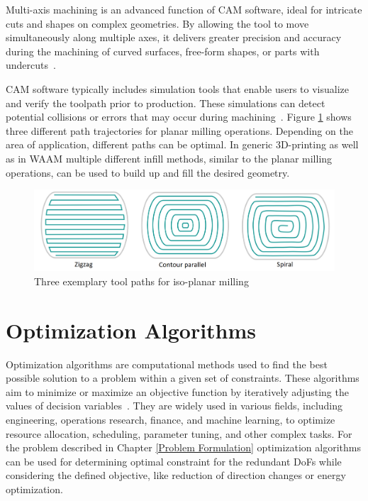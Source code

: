 Multi-axis machining is an advanced function of \acrshort{CAM} software, ideal for intricate cuts and shapes on complex geometries. By allowing the tool to move simultaneously along multiple axes, it delivers greater precision and accuracy during the machining of curved surfaces, free-form shapes, or parts with undercuts~\cite{Takeuchi.2014}.

\acrshort{CAM} software typically includes simulation tools that enable users to visualize and verify the toolpath prior to production. These simulations can detect potential collisions or errors that may occur during machining~\cite{Dubovska.2014}. 
\newpage
Figure \ref{3path} shows three different path trajectories for planar milling operations. Depending on the area of application, different paths can be optimal. In generic 3D-printing as well as in \acrshort{WAAM} multiple different infill methods, similar to the planar milling operations, can be used to build up and fill the desired geometry.  

\begin{figure}[H]
	\centerline{\includegraphics[width=1\textwidth]{figures/path.png}}
	\caption{Three exemplary tool paths for iso-planar milling~\cite{Zhao.2018}}
	\label{3path}
\end{figure}

\section{Optimization Algorithms}%

Optimization algorithms are computational methods used to find the best possible solution to a problem within a given set of constraints. These algorithms aim to minimize or maximize an objective function by iteratively adjusting the values of decision variables~\cite{Sivanandam.2007b}. They are widely used in various fields, including engineering, operations research, finance, and machine learning, to optimize resource allocation, scheduling, parameter tuning, and other complex tasks. For the problem described in Chapter \ref{Problem Formulation} optimization algorithms can be used for determining optimal constraint for the redundant \acrshort{DoF}s while considering the defined objective, like reduction of direction changes or energy optimization. 


